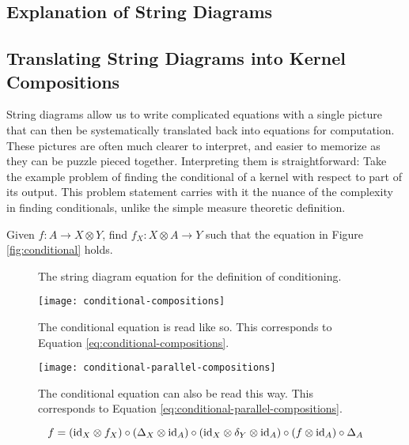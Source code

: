 \subsection{Explanation of String Diagrams}

\subsection{Translating String Diagrams into Kernel Compositions}
String diagrams allow us to write complicated equations with a single picture that can then be systematically translated back into equations for computation.
These pictures are often much clearer to interpret, and easier to memorize as they can be puzzle pieced together.
Interpreting them is straightforward: Take the example problem of finding the conditional of a kernel with respect to part of its output.
This problem statement carries with it the nuance of the complexity in finding conditionals, unlike the simple measure theoretic definition.

Given $f:A\rightarrow X\otimes Y$, find $f_X : X\otimes A \rightarrow Y$ such that the equation in Figure \ref{fig:conditional} holds.

\begin{figure}[htb]
	\centering
	\caption{The string diagram equation for the definition of conditioning.}
	\label{tikz:conditional}
\end{figure}

\begin{figure}[htb]
	\centering
	\texttt{[image: conditional-compositions]}
	\caption{The conditional equation is read like so. This corresponds to Equation \ref{eq:conditional-compositions}.}
	\label{fig:conditional-compositions}
\end{figure}

\begin{figure}[htb]
	\centering
	\texttt{[image: conditional-parallel-compositions]}
	\caption{The conditional equation can also be read this way. This corresponds to Equation \ref{eq:conditional-parallel-compositions}.}
	\label{fig:conditional-parallel-compositions}
\end{figure}

\begin{equation}
\label{eq:conditional-compositions}
f = (\mathrm{id}_X \otimes f_X) \circ (\Delta_X \otimes \mathrm{id}_A)
\circ (\mathrm{id}_X \otimes \delta_Y \otimes \mathrm{id}_A) \circ (f \otimes \mathrm{id}_A) \circ \Delta_A
\end{equation}

